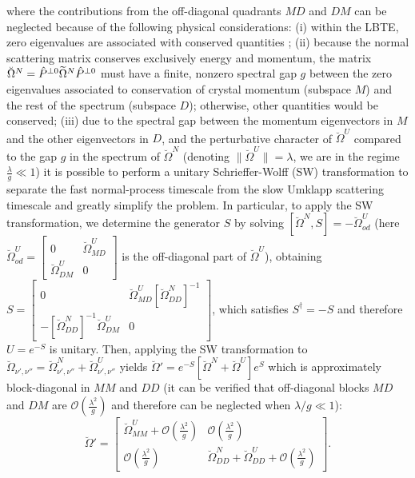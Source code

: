\documentclass[
prb,
twocolumn,
superscriptaddress,
 amsmath,amssymb,
 aps,
longbibliography,
]{revtex4-2}
\begin{document}
where the contributions from the off-diagonal quadrants $MD$ and $DM$ can be neglected because of the following physical considerations: (i) within the LBTE, zero eigenvalues are associated with conserved quantities \cite{Simoncelli2020,ziman1960electrons}; (ii) because the normal scattering matrix conserves exclusively energy and momentum, the matrix $\breve{\Omega}^N=\hat P^{\perp \rm 0} \widetilde{\Omega}^N\hat P^{\perp \rm 0}$ must have a finite, nonzero spectral gap $g$ between the zero eigenvalues associated to conservation of crystal momentum (subspace $M$) and the rest of the spectrum (subspace $D$); otherwise, other quantities would be conserved; (iii) due to the spectral gap between the momentum eigenvectors in $M$ and the other eigenvectors in $D$, and the perturbative character of $\breve{\Omega}^{U}$  compared to the gap $g$ in the spectrum of $\breve{\Omega}^{N}$ (denoting $\|\breve{\Omega}^{U}\|=\lambda$, we are in the regime  $\frac{\lambda}{g}\ll 1$)
it is possible to perform a unitary Schrieffer-Wolff (SW) transformation \cite{winklerSpinOrbitCouplingEffects2003,bravyiSchriefferWolffTransformation2011} to separate the fast normal-process timescale from the slow Umklapp scattering timescale and
greatly simplify the problem.
In particular, to apply the SW transformation, we determine the generator $S$ by solving $[\breve{\Omega}^N,S]=-\breve{\Omega}^U_{od}$ (here $\breve{\Omega}^U_{od}{=}\begin{bmatrix}
0 &  \breve{\Omega}^{U}_{MD}\\[2pt]
\breve{\Omega}^{U}_{DM} & 0
\end{bmatrix}$ is the off-diagonal part of $\breve{\Omega}^U$), obtaining
$S{=}
\begin{bmatrix}
0 &  \breve{\Omega}^{U}_{MD}[\breve{\Omega}^{N}_{DD}]^{-1} \\[2pt]
-[\breve{\Omega}^{N}_{DD}]^{-1}\breve{\Omega}^{U}_{DM} & 0
\end{bmatrix}
$, which satisfies $S^\dagger=-S$ and therefore $U=e^{-S}$ is unitary.
Then, applying the SW transformation to  ${\breve{\Omega}}_{\nu',\nu''}{=}{\breve{\Omega}}^{N}_{\nu',\nu''}{+}{\breve{\Omega}}^{U}_{\nu',\nu''}$ yields
$\breve{\Omega}'=e^{-S} [\breve{\Omega}^N+\breve{\Omega}^U]e^{S}$
which is approximately block-diagonal in $MM$ and $DD$ (it can be verified that off-diagonal blocks $MD$ and $DM$ are $\mathcal{O}(\frac{\lambda^2}{g})$ and therefore can be neglected when $\lambda/g \ll 1$):\\[-5mm]
\begin{equation}
	\breve{\Omega}'=
\begin{bmatrix}
\breve{\Omega}^{U}_{MM}+\mathcal{O}(\frac{\lambda^2}{g}) & \mathcal{O}(\frac{\lambda^2}{g})\\[2pt]
\mathcal{O}(\frac{\lambda^2}{g}) & \breve{\Omega}^{N}_{DD}+\breve{\Omega}^{U}_{DD}+\mathcal{O}(\frac{\lambda^2}{g})
\end{bmatrix}.
\label{eq:full_matrix}
\end{equation}
\end{document}
